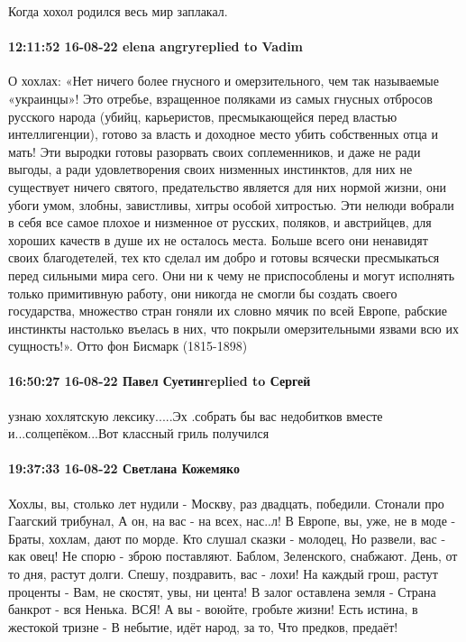 Когда хохол родился весь мир заплакал.

\paragraph{12:11:52 16-08-22 elena angryreplied to Vadim}

\obeycr
О хохлах:
«Нет ничего более гнусного и омерзительного,
чем так называемые «украинцы»! Это отребье,
взращенное поляками из самых гнусных
отбросов русского народа (убийц, карьеристов,
пресмыкающейся перед властью интеллигенции),
готово за власть и доходное место убить
собственных отца и мать!
Эти выродки готовы разорвать своих
соплеменников, и даже не ради выгоды, а
ради удовлетворения своих низменных
инстинктов, для них не существует ничего
святого, предательство является для
них нормой жизни, они убоги умом, злобны,
завистливы, хитры особой хитростью. Эти
нелюди вобрали в себя все самое плохое
и низменное от русских, поляков, и австрийцев,
для хороших качеств в душе их не осталось
места. Больше всего они ненавидят своих
благодетелей, тех кто сделал им добро
и готовы всячески пресмыкаться перед
сильными мира сего.
Они ни к чему не приспособлены и
могут исполнять только примитивную работу,
они никогда не смогли бы создать своего
государства, множество стран гоняли
их словно мячик по всей Европе, рабские
инстинкты настолько въелась в них, что
покрыли омерзительными язвами всю их
сущность!».
Отто фон Бисмарк (1815-1898)
\restorecr

\paragraph{16:50:27 16-08-22 Павел Суетинreplied to Сергей}

узнаю хохлятскую лексику.....Эх .собрать бы вас недобитков вместе
и...солцепёком...Вот классный гриль получился

\paragraph{19:37:33 16-08-22 Светлана Кожемяко}

\obeycr
Хохлы, вы, столько лет нудили -
Москву, раз двадцать, победили.
Стонали про Гаагский трибунал,
А он, на вас - на всех, нас..л!
В Европе, вы, уже, не в моде -
Браты, хохлам, дают по морде.
Кто слушал сказки - молодец,
Но развели, вас - как овец!
Не спорю - зброю поставляют.
Баблом, Зеленского, снабжают.
День, от то дня, растут долги.
Спешу, поздравить, вас - лохи!
На каждый грош, растут проценты -
Вам, не скостят, увы, ни цента!
В залог оставлена земля -
Страна банкрот - вся Ненька.
ВСЯ!
А вы - воюйте, гробьте жизни!
Есть истина, в жестокой тризне -
В небытие, идёт народ, за то,
Что предков, предаёт!
\restorecr


